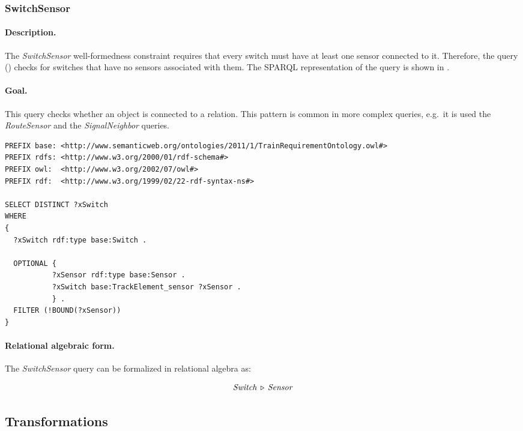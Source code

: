 \subsubsection{SwitchSensor}

\paragraph{Description.} The \textit{SwitchSensor} well-formedness constraint requires that every switch must have at least one sensor connected to it. Therefore, the query () checks for switches that have no sensors associated with them. The SPARQL representation of the query is shown in .

\paragraph{Goal.} This query checks whether an object is connected to a relation. This pattern is common in more complex queries, e.g.\ it is used the \textit{RouteSensor} and the \textit{SignalNeighbor} queries.

\begin{lstlisting}[caption=The RouteSensor query in SPARQL, label=lst:switchsensor-sparql]
PREFIX base: <http://www.semanticweb.org/ontologies/2011/1/TrainRequirementOntology.owl#>
PREFIX rdfs: <http://www.w3.org/2000/01/rdf-schema#>
PREFIX owl:  <http://www.w3.org/2002/07/owl#>
PREFIX rdf:  <http://www.w3.org/1999/02/22-rdf-syntax-ns#>

SELECT DISTINCT ?xSwitch
WHERE
{
  ?xSwitch rdf:type base:Switch .

  OPTIONAL { 
           ?xSensor rdf:type base:Sensor .
           ?xSwitch base:TrackElement_sensor ?xSensor .
           } .
  FILTER (!BOUND(?xSensor))
}
\end{lstlisting}


\paragraph{Relational algebraic form.} The \textit{SwitchSensor} query can be formalized in relational algebra as:

$$ \mathit{Switch} \, \triangleright \, \mathit{Sensor} $$


\subsection{Transformations}


